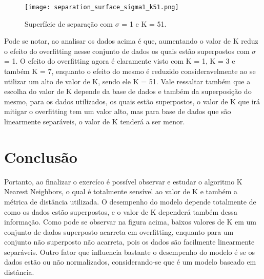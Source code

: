 \documentclass{article} %
\begin{document}
\begin{figure}[h] %
    \centering %
    \texttt{[image: separation\_surface\_sigma1\_k51.png]} %
    \caption{Superfície de separação com $\sigma$ = 1 e K = 51.} %
    \label{fig:exemplo} %
\end{figure}

\newpage

Pode se notar, ao analisar os dados acima é que, aumentando o valor de K reduz o efeito do overfitting nesse conjunto de dados os quais estão superpostos com $\sigma$ = 1. O efeito do overfitting agora é claramente visto com K = 1, K = 3 e também K = 7, enquanto o efeito do mesmo é reduzido consideravelmente ao se utilizar um alto de valor de K, sendo ele K = 51. Vale ressaltar também que a escolha do valor de K depende da base de dados e também da superposição do mesmo, para os dados utilizados, os quais estão superpostos, o valor de K que irá mitigar o overfitting tem um valor alto, mas para base de dados que são linearmente separáveis, o valor de K tenderá a ser menor.

\newpage

\section{Conclusão}

Portanto, ao finalizar o exercíco é possível observar e estudar o algoritmo K Nearest Neighbors, o qual é totalmente sensível ao valor de K e também a métrica de distância utilizada. O desempenho do modelo depende totalmente de como os dados estão superpostos, e o valor de K dependerá também dessa informação. Como pode se observar na figura acima, baixos valores de K em um conjunto de dados superposto acarreta em overfitting, enquanto para um conjunto não superposto não acarreta, pois os dados são facilmente linearmente separáveis. Outro fator que influencia bastante o desempenho do modelo é se os dados estão ou não normalizados, considerando-se que é  um modelo baseado em distância.
\end{document}
